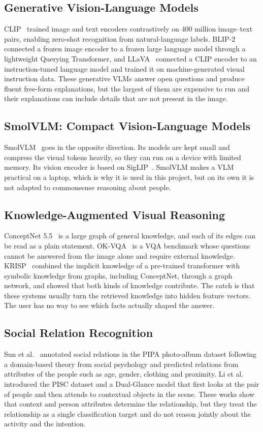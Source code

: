 \subsection{Generative Vision-Language Models}
CLIP~\cite{radford2021clip} trained image and text encoders contrastively on 400 million image--text pairs, enabling zero-shot recognition from natural-language labels. BLIP-2~\cite{li2023blip2} connected a frozen image encoder to a frozen large language model through a lightweight Querying Transformer, and LLaVA~\cite{liu2023llava} connected a CLIP encoder to an instruction-tuned language model and trained it on machine-generated visual instruction data. These generative VLMs answer open questions and produce fluent free-form explanations, but the largest of them are expensive to run and their explanations can include details that are not present in the image.

\subsection{SmolVLM: Compact Vision-Language Models}
SmolVLM~\cite{marafioti2025smolvlm} goes in the opposite direction. Its models are kept small and compress the visual tokens heavily, so they can run on a device with limited memory. Its vision encoder is based on SigLIP~\cite{zhai2023siglip}. SmolVLM makes a VLM practical on a laptop, which is why it is used in this project, but on its own it is not adapted to commonsense reasoning about people.

\subsection{Knowledge-Augmented Visual Reasoning}
ConceptNet 5.5~\cite{speer2017conceptnet} is a large graph of general knowledge, and each of its edges can be read as a plain statement. OK-VQA~\cite{marino2019okvqa} is a VQA benchmark whose questions cannot be answered from the image alone and require external knowledge. KRISP~\cite{marino2021krisp} combined the implicit knowledge of a pre-trained transformer with symbolic knowledge from graphs, including ConceptNet, through a graph network, and showed that both kinds of knowledge contribute. The catch is that these systems usually turn the retrieved knowledge into hidden feature vectors. The user has no way to see which facts actually shaped the answer.

\subsection{Social Relation Recognition}
Sun et al.~\cite{sun2017domain} annotated social relations in the PIPA photo-album dataset following a domain-based theory from social psychology and predicted relations from attributes of the people such as age, gender, clothing and proximity. Li et al.~\cite{li2017dualglance} introduced the PISC dataset and a Dual-Glance model that first looks at the pair of people and then attends to contextual objects in the scene. These works show that context and person attributes determine the relationship, but they treat the relationship as a single classification target and do not reason jointly about the activity and the intention.

